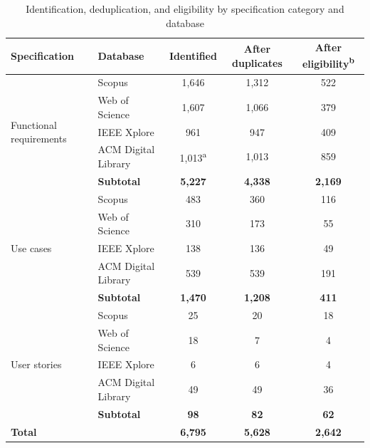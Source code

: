 \documentclass[10pt,journal,twoside,letterpaper]{IEEEtran}
\begin{document}
    \begin{table}[!tb]
        \caption{Identification, deduplication, and eligibility by specification category and database}
        \label{tab:distrib}
        \centering
        \small
        \setlength{\tabcolsep}{6pt}
        \begin{tabular}{@{}llccc@{}}
            \toprule
            \textbf{Specification} & \textbf{Database} & \textbf{Identified} & \textbf{After duplicates} & \textbf{After eligibility\textsuperscript{b}} \\
            \midrule
            \multirow{5}{*}{Functional requirements} & Scopus & 1,646 & 1,312 & 522 \\
            & Web of Science      & 1,607 & 1,066 & 379 \\
            & IEEE Xplore         & 961    & 947    & 409 \\
            & ACM Digital Library & 1,013\textsuperscript{a} & 1,013 & 859 \\
            \cmidrule(l){2-5}
            & \textbf{Subtotal}   & \textbf{5,227} & \textbf{4,338} & \textbf{2,169} \\
            \midrule
            \multirow{5}{*}{Use cases} & Scopus & 483 & 360 & 116 \\
            & Web of Science      & 310 & 173 & 55 \\
            & IEEE Xplore         & 138 & 136 & 49 \\
            & ACM Digital Library & 539 & 539 & 191 \\
            \cmidrule(l){2-5}
            & \textbf{Subtotal}   & \textbf{1,470} & \textbf{1,208} & \textbf{411} \\
            \midrule
            \multirow{5}{*}{User stories} & Scopus & 25 & 20 & 18 \\
            & Web of Science      & 18 & 7 & 4 \\
            & IEEE Xplore         & 6 & 6 & 4 \\
            & ACM Digital Library & 49 & 49 & 36 \\
            \cmidrule(l){2-5}
            & \textbf{Subtotal}   & \textbf{98} & \textbf{82} & \textbf{62} \\
            \midrule
            \textbf{Total} & & \textbf{6,795} & \textbf{5,628} & \textbf{2,642} \\
            \bottomrule
        \end{tabular}
        \\[3pt]

\end{table}
\end{document}
